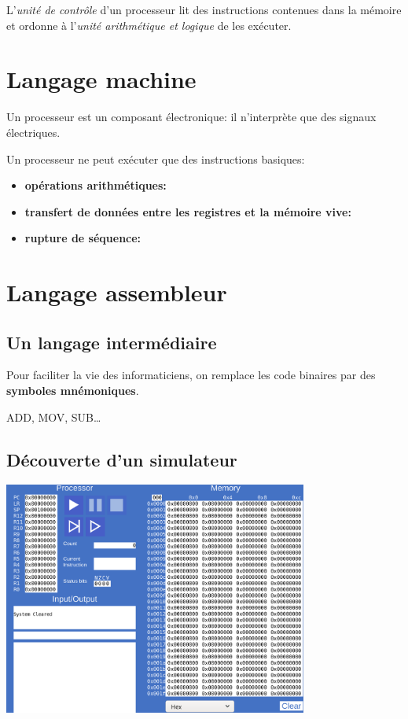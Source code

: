 \documentclass[a4paper,11pt]{article}
\begin{document}
L'\emph{unité de contrôle} d'un processeur lit des instructions contenues dans la mémoire et ordonne à l'\emph{unité arithmétique et logique} de les exécuter.
\begin{center}
\end{center}
\section{Langage machine}
\begin{aretenir}[]
    Un processeur est un composant électronique: il n'interprète que des signaux électriques.
\end{aretenir}
Un processeur ne peut exécuter que des instructions basiques:
    \begin{itemize}
        \item \textbf{opérations arithmétiques:} \emph{}
        \item \textbf{transfert de données entre les registres et la mémoire vive:} \emph{}
        \item \textbf{rupture de séquence:} \emph{}
    \end{itemize}
\section{Langage assembleur}
\subsection{Un langage intermédiaire}
\begin{aretenir}[]
    Pour faciliter la vie des informaticiens, on remplace les code binaires par des \textbf{symboles mnémoniques}.

    \centering ADD, MOV, SUB\dots
\end{aretenir}
\subsection{Découverte d'un simulateur}
\begin{center}
    \centering
    \includegraphics[width=10cm]{ressources/simulateur.png}
    \label{IMG}
\end{center}
\end{document}

